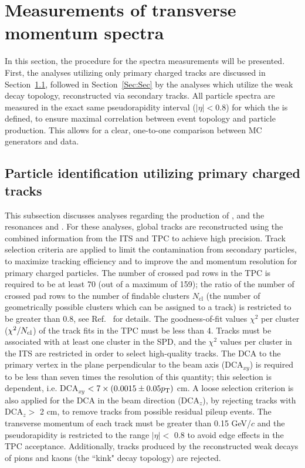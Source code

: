 \section{Measurements of transverse momentum spectra}\label{Sec:Details}

In this section, the procedure for the \pt spectra measurements will be presented. First, the analyses utilizing only primary charged tracks are discussed in Section~\ref{Sec:Prim}, followed in Section~\ref{Sec:Sec} by the analyses which utilize the weak decay topology, reconstructed via secondary tracks. All particle spectra are measured in the exact same pseudorapidity interval ($|\eta|<0.8$) for which the \SOPT is defined, to ensure maximal correlation between event topology and particle production. This allows for a clear, one-to-one comparison between MC generators and data. 

\subsection{Particle identification utilizing primary charged tracks}\label{Sec:Prim}
This subsection discusses analyses regarding the production of \pikp, and the resonances \PHI and
\KSTAR. For these analyses, global tracks are reconstructed using the combined information from the ITS and TPC to achieve high precision.  Track selection criteria are applied to limit the contamination from secondary particles, to maximize tracking efficiency and to improve the \dedx and momentum resolution for primary charged particles. The number of crossed pad rows in the TPC is
required to be at least 70 (out of a maximum of 159); the ratio of
the number of crossed pad rows to the number of findable clusters $N_{\mathrm{cl}}$ (the number of geometrically possible clusters which can be assigned to a track) is restricted to be greater than 0.8, see Ref.~\cite{ALICE2} for details. The
goodness-of-fit values $\chi^2$ per cluster ($\chi^2/N_{\rm cl}$) of the track fits in the TPC must be less than 4. Tracks must be associated with at least one cluster in the SPD, and the $\chi^2$ values per cluster in the ITS are restricted in order to select high-quality tracks. The DCA to the primary vertex in the plane perpendicular to the beam axis (DCA$_{xy}$) is required to be less than seven times the resolution of this quantity; this selection is \pt dependent, i.e. DCA$_{xy}$ $< 7\times(0.0015 \pm 0.05p_{\rm T}) $ cm. A loose selection criterion is also applied for the DCA in the beam direction (DCA$_{z}$), by rejecting tracks with DCA$_{z}>$ 2 cm, to remove tracks from possible residual pileup events. The transverse momentum of each track must be greater than 0.15
GeV/$c$ and the pseudorapidity is restricted to the range $|\eta|<$ 0.8 to avoid edge effects in the TPC acceptance. Additionally, tracks produced by the reconstructed weak decays of pions and kaons (the “kink" decay topology) are rejected.

